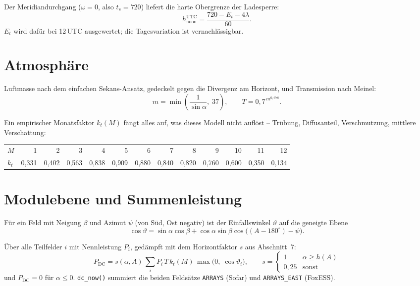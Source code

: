 \documentclass[11pt, a4paper]{article}
\begin{document}
Der Meridiandurchgang ($\omega = 0$, also $t_s = 720$) liefert die harte
Obergrenze der Ladesperre:
\[
h_{\text{noon}}^{\text{UTC}} = \frac{720 - E_t - 4\lambda}{60}.
\]
$E_t$ wird dafür bei 12\,UTC ausgewertet; die Tagesvariation ist vernachlässigbar.

\section{Atmosphäre}

Luftmasse nach dem einfachen Sekans-Ansatz, gedeckelt gegen die Divergenz am
Horizont, und Transmission nach Meinel:
\[
m = \min\!\left(\frac{1}{\sin\alpha},\; 37\right),
\qquad
T = 0{,}7^{\,m^{0{,}678}} .
\]

Ein empirischer Monatsfaktor $k_t(M)$ fängt alles auf, was dieses Modell nicht
auflöst -- Trübung, Diffusanteil, Verschmutzung, mittlere Verschattung:

\begin{center}
\begin{tabular}{lrrrrrrrrrrrr}
\toprule
$M$ & 1 & 2 & 3 & 4 & 5 & 6 & 7 & 8 & 9 & 10 & 11 & 12\\
$k_t$ & 0{,}331 & 0{,}402 & 0{,}563 & 0{,}838 & 0{,}909 & 0{,}880
      & 0{,}840 & 0{,}820 & 0{,}760 & 0{,}600 & 0{,}350 & 0{,}134\\
\bottomrule
\end{tabular}
\end{center}

\section{Modulebene und Summenleistung}

Für ein Feld mit Neigung $\beta$ und Azimut $\psi$ (von Süd, Ost negativ) ist der
Einfallswinkel $\vartheta$ auf die geneigte Ebene
\[
\cos\vartheta = \sin\alpha\cos\beta
   + \cos\alpha\sin\beta\cos\bigl((A - 180^\circ) - \psi\bigr).
\]

Über alle Teilfelder $i$ mit Nennleistung $P_i$, gedämpft mit dem
Horizontfaktor $s$ aus Abschnitt~7:
\[
\boxed{\;
P_{\text{DC}} = s(\alpha, A)\,\sum_i P_i\, T\, k_t(M)\, \max\bigl(0,\; \cos\vartheta_i\bigr),
\qquad
s = \begin{cases} 1 & \alpha \ge h(A)\\ 0{,}25 & \text{sonst}\end{cases}
\;}
\]
und $P_{\text{DC}} = 0$ für $\alpha \le 0$. \texttt{dc\_now()} summiert die beiden
Feldsätze \texttt{ARRAYS} (Sofar) und \texttt{ARRAYS\_EAST} (FoxESS).
\end{document}
